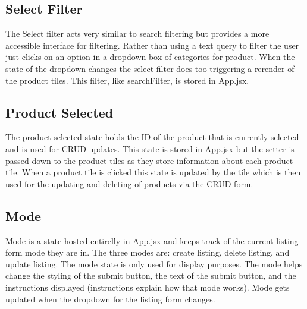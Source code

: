 \documentclass{article}[12pt]
\begin{document}
\subsection{Select Filter}
The Select filter acts very similar to search filtering but provides a more accessible interface for filtering. Rather than using a text query to filter the user just clicks on an option in a dropdown box of categories for product. When the state of the dropdown changes the select filter does too triggering a rerender of the product tiles. This filter, like searchFilter, is stored in App.jsx.
\subsection{Product Selected}
The product selected state holds the ID of the product that is currently selected and is used for CRUD updates. This state is stored in App.jsx but the setter is passed down to the product tiles as they store information about each product tile. When a product tile is clicked this state is updated by the tile which is then used for the updating and deleting of products via the CRUD form.

\subsection{Mode}
Mode is a state hosted entirelly in App.jsx and keeps track of the current listing form mode they are in. The three modes are: create listing, delete listing, and update listing. The mode state is only used for display purposes. The mode helps change the styling of the submit button, the text of the submit button, and the instructions displayed (instructions explain how that mode works). Mode gets updated when the dropdown for the listing form changes.
\end{document}
